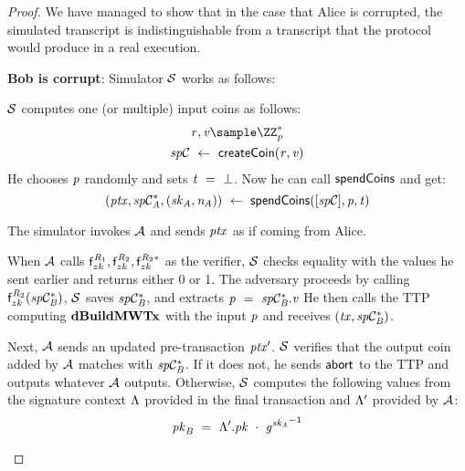 \begin{proof}
    We have managed to show that in the case that Alice is corrupted, the simulated transcript is indistinguishable from a transcript that the protocol would produce in a real execution.

    \textbf{Bob is corrupt}: Simulator $\mathcal{S}$ works as follows:
    \begin{asparaenum}
        \item $\mathcal{S}$ computes one (or multiple) input coins as follows:
        \begin{gather*}
            \varBlindingFactor, \varValue \sample \cnstIntegersPrimeWithoutZero{\varPrime} \\
            \varSpendableCoin \opFunResult \procCreateCoin{\varBlindingFactor}{\varValue}
        \end{gather*}
        He chooses $\mathit{p}$ randomly and sets $\mathit{t} ~=~ \bot$.
        Now he can call $\mathsf{spendCoins}$ and get:
        \[ (\mathit{ptx}, \mathit{sp}\mathcal{C}_{\mathit{A}}^*, (\mathit{sk}_{\mathit{A}}, \mathit{\mathit{n}_{\mathit{A}}})) ~\leftarrow~ \mathsf{spendCoins}([\mathit{sp}\mathcal{C}],\mathit{p},\mathit{t}) \]
        \item The simulator invokes $\mathcal{A}$ and sends $\mathit{ptx}$ as if coming from Alice.
        \item When $\mathcal{A}$ calls $\mathsf{f}^{\mathit{R}_1}_{zk},\mathsf{f}^{\mathit{R}_2}_{zk},\mathsf{f}^{\mathit{R}_2*}_{zk}$ as the verifier, $\mathcal{S}$ checks equality with the values he sent earlier and returns either 0 or 1.
        The adversary proceeds by calling $\mathsf{f}^{\mathit{R}_2}_{zk}(\mathit{sp}\mathcal{C}_{\mathit{B}}^*)$, $\mathcal{S}$ saves $\mathit{sp}\mathcal{C}_{\mathit{B}}^*$, and extracts $\mathit{p} ~=~ \mathit{sp}\mathcal{C}_{\mathit{B}}^*.\mathit{v}$
        He then calls the TTP computing $\mathbf{dBuildMWTx}$ with the input $\mathit{p}$ and receives $(\mathit{tx}, \mathit{sp}\mathcal{C}_{\mathit{B}}^*)$.
        \item Next, $\mathcal{A}$ sends an updated pre-transaction ${\mathit{ptx}}'$.
        $\mathcal{S}$ verifies that the output coin added by $\mathcal{A}$ matches with $\mathit{sp}\mathcal{C}_{\mathit{B}}^*$.
        If it does not, he sends $\mathsf{abort}$ to the TTP and outputs whatever $\mathcal{A}$ outputs.
        Otherwise, $\mathcal{S}$ computes the following values from the signature context $\Lambda$ provided in the final transaction and ${\Lambda}'$ provided by $\mathcal{A}$:
        \begin{gather*}
            \varPubKeyBob \opEqNoQ \funStarAlt{\varSigContext}.\varPubKey \opAddPoint {\funGen{\varSecKeyAlice}}^{-1} \\

\end{gather*}
\end{asparaenum}
\end{proof}
